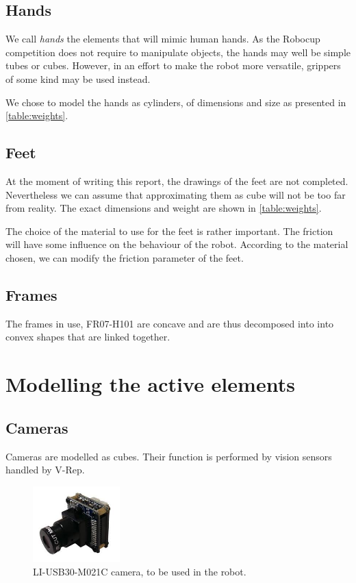 \subsection{Hands}
We call \emph{hands} the elements that will mimic human hands. As the Robocup competition does not require to manipulate objects, the hands may well be simple tubes or cubes. However, in an effort to make the robot more versatile, grippers of some kind may be used instead.

We chose to model the hands as cylinders, of dimensions and size as presented in \cref{table:weights}.

\subsection{Feet}
At the moment of writing this report, the drawings of the feet are not completed. Nevertheless we can assume that approximating them as cube will not be too far from reality. The exact dimensions and weight are shown in \cref{table:weights}.

The choice of the material to use for the feet is rather important. The friction will have some influence on the behaviour of the robot. According to the material chosen, we can modify the friction parameter of the feet.

\subsection{Frames}
The frames in use, FR07-H101 are concave and are thus decomposed into into convex shapes that are linked together. 

\section{Modelling the active elements}
\subsection{Cameras}
Cameras are modelled as cubes. Their function is performed by vision sensors handled by V-Rep.
\begin{figure}[htp]
\center
    \includegraphics[width = 0.3\textwidth]{figures/li_cam}
    \caption{LI-USB30-M021C camera, to be used in the robot.}
    \label{fig:camera}
\end{figure}

